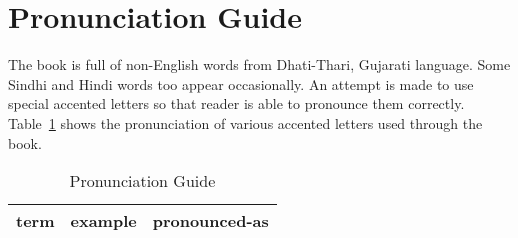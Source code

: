 \chapter*{Pronunciation Guide}

The book is full of non-English words from Dhati-Thari, Gujarati language. Some Sindhi and Hindi words too appear occasionally. An attempt is made to use special accented letters so that reader is able to pronounce them correctly. Table~\ref{tbl:pronunciation} shows the pronunciation of various accented letters used through the book.

\begin{table}
\begin{center}
\begin{tabular}{|l|l|l|}
\hline
\textbf{term} & \textbf{example} & \textbf{pronounced-as} \\
\hline

\hline
\end{tabular}
\end{center}
\caption{Pronunciation Guide}
\label{tbl:pronunciation}
\end{table}


